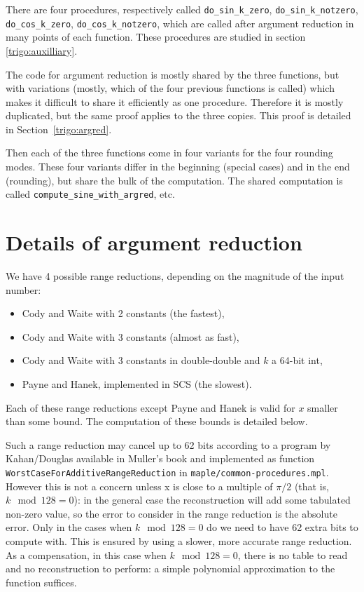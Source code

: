 There are four procedures, respectively called \verb!do_sin_k_zero!,
\verb!do_sin_k_notzero!, \verb!do_cos_k_zero!,
\verb!do_cos_k_notzero!, which are called after argument reduction in
many points of each function. These procedures are studied in section
\ref{trigo:auxilliary}.

The code for argument reduction is mostly shared by the three
functions, but with variations (mostly, which of the four previous
functions is called) which makes it difficult to share it efficiently
as one procedure. Therefore it is mostly duplicated, but the same
proof applies to the three copies. This proof is detailed in
Section~\ref{trigo:argred}.

Then each of the three functions come in four variants for the four
rounding modes. These four variants differ in the beginning (special
cases) and in the end (rounding), but share the bulk of the
computation. The shared computation is  called
\verb!compute_sine_with_argred!, etc.




\section{Details of argument reduction
\label{trigo:argred}}


We have 4 possible range reductions, depending on the magnitude of the input number:

\begin{itemize}
\item Cody and Waite with 2 constants (the fastest),
\item Cody and Waite with 3 constants (almost as fast),
\item Cody and Waite with 3 constants in double-double and $k$ a
  64-bit int,
\item Payne and Hanek, implemented in SCS (the slowest).
\end{itemize}
Each of these range reductions except Payne and Hanek is valid for $x$
smaller than some bound. The computation of these bounds is detailed
below.

Such a range reduction may cancel up to 62 bits according to a program
by Kahan/Douglas available in Muller's book \cite{Muller97} and
implemented as function \texttt{WorstCaseForAdditiveRangeReduction} in
\texttt{maple/common-procedures.mpl}.  However this is not a concern
unless x is close to a multiple of $\pi/2$ (that is, $k \mod 128=0$): in
the general case the reconstruction will add some tabulated non-zero
value, so the error to consider in the range reduction is the absolute
error.  Only in the cases when $k \mod 128=0$ do we need to have 62
extra bits to compute with. This is ensured by using a slower, more
accurate range reduction. As a compensation, in this case when $k \mod
128=0$, there is no table to read and no reconstruction to perform: a
simple polynomial approximation to the function suffices.



